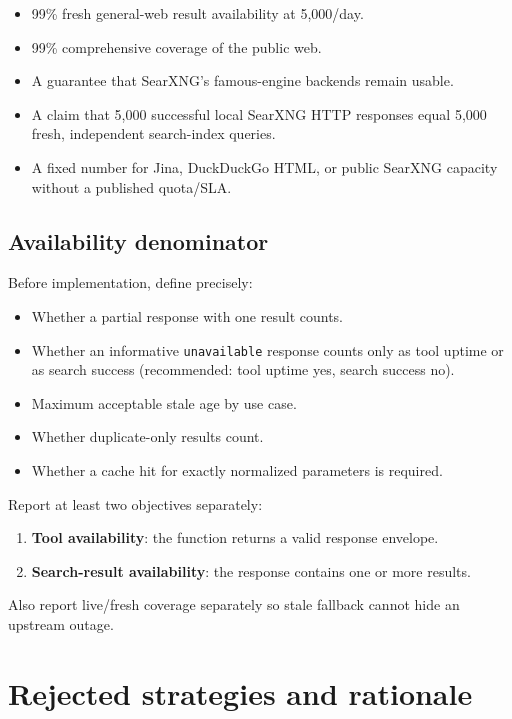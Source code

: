 \documentclass[11pt]{article}
\begin{document}
\begin{itemize}
\item 99\% fresh general-web result availability at 5,000/day.
\item 99\% comprehensive coverage of the public web.
\item A guarantee that SearXNG's famous-engine backends remain usable.
\item A claim that 5,000 successful local SearXNG HTTP responses equal 5,000 fresh,
independent search-index queries.
\item A fixed number for Jina, DuckDuckGo HTML, or public SearXNG capacity without a
published quota/SLA.
\end{itemize}
\subsection*{Availability denominator}
\label{sec:orgee8b813}

Before implementation, define precisely:

\begin{itemize}
\item Whether a partial response with one result counts.
\item Whether an informative \texttt{unavailable} response counts only as tool uptime or
as search success (recommended: tool uptime yes, search success no).
\item Maximum acceptable stale age by use case.
\item Whether duplicate-only results count.
\item Whether a cache hit for exactly normalized parameters is required.
\end{itemize}

Report at least two objectives separately:

\begin{enumerate}
\item \textbf{Tool availability}: the function returns a valid response envelope.
\item \textbf{Search-result availability}: the response contains one or more results.
\end{enumerate}

Also report live/fresh coverage separately so stale fallback cannot hide an
upstream outage.
\section*{Rejected strategies and rationale}
\label{sec:org926003a}
\end{document}
